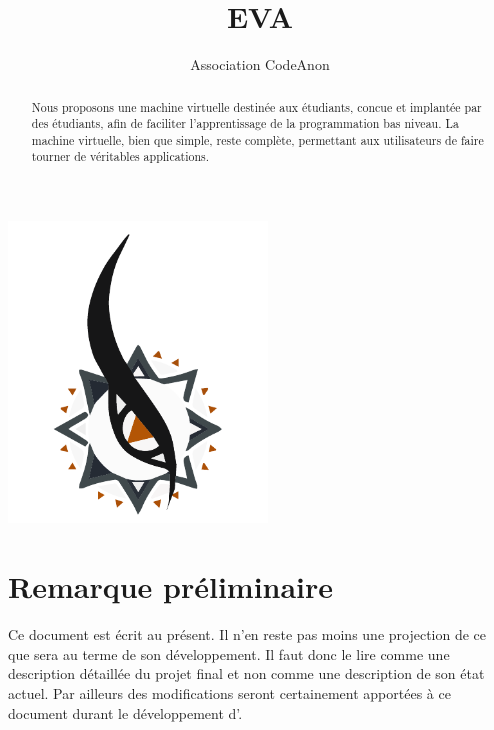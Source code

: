 \documentclass[11pt,twoside]{article}
\begin{document}
\title{EVA}
\author{Association CodeAnon}

\maketitle
\begin{abstract}
  Nous proposons une machine virtuelle destinée aux étudiants, concue et implantée par des étudiants, afin de faciliter l'apprentissage de la programmation bas niveau. La machine virtuelle, bien que simple, reste complète, permettant aux utilisateurs de faire tourner de véritables applications.
\end{abstract}
\vfill
\begin{center}
  \includegraphics[height=8cm]{logo_graph.pdf}
\end{center}
\vfill
\cleardoublepage

\hspace{0pt}
\vfill

\section*{Remarque préliminaire}

Ce document est écrit au présent. Il n'en reste pas moins une projection de ce que sera  au terme de son développement. Il faut donc le lire comme une description détaillée du projet final  et non comme une description de son état actuel. Par ailleurs des modifications seront certainement apportées à ce document durant le développement d'.

\vfill
\hspace{0pt}

\clearpage

\tableofcontents
\cleardoublepage
\end{document}
